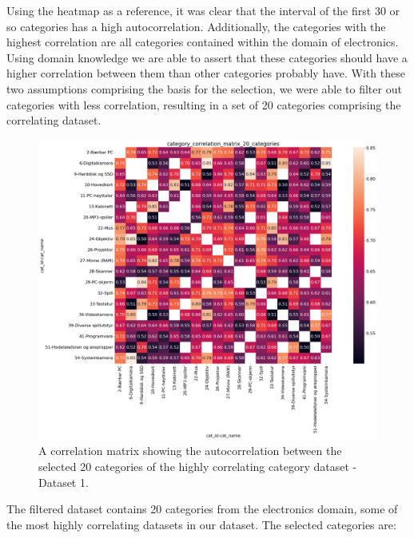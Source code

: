 Using the heatmap as a reference, it was clear that the interval of the first 30 or so categories has a high autocorrelation.
Additionally, the categories with the highest correlation are all categories contained within the domain of electronics.
Using domain knowledge we are able to assert that these categories should have a higher correlation between them than other categories probably have.
With these two assumptions comprising the basis for the selection, we were able to filter out categories with less correlation, resulting in a set of 20 categories comprising the correlating dataset.
\begin{figure}[H]
  \centering
  \includegraphics[width=\textwidth]{./figs/dataset/category_correlation_matrix_20_categories.png}
  \hfill
  \caption{A correlation matrix showing the autocorrelation between the selected 20 categories of the highly correlating category dataset - Dataset 1.}
  \label{fig:dataset:heatmap_20_correlating}
\end{figure}


The filtered dataset contains 20 categories from the electronics domain, some of the most highly correlating datasets in our dataset.
The selected categories are:


